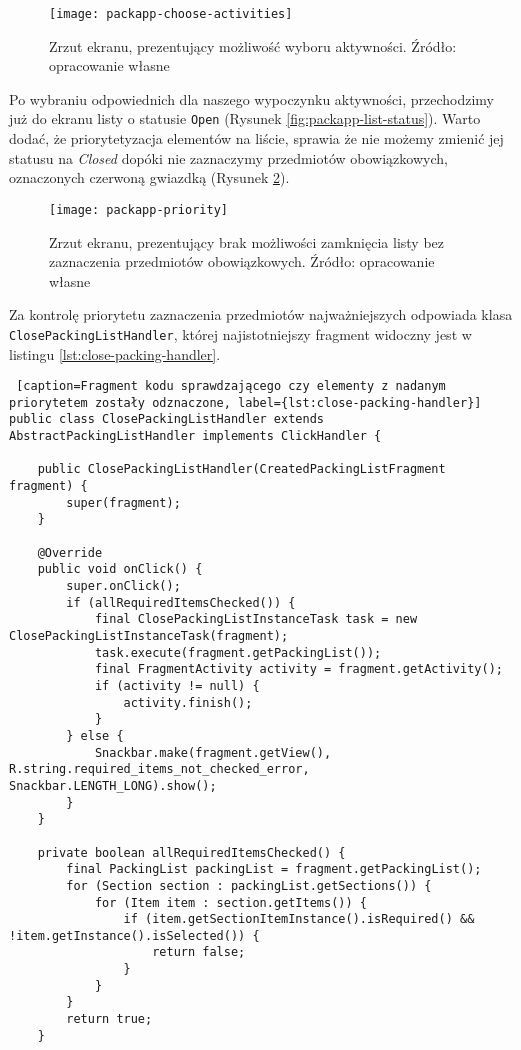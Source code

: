 \documentclass[a4paper,12pt]{article}
\begin{document}
\begin{figure}[H]
    \centering
    \texttt{[image: packapp-choose-activities]}
    \caption{Zrzut ekranu, prezentujący możliwość wyboru aktywności. Źródło: opracowanie własne}
    \label{fig:packapp-choose-activities}
\end{figure}

Po wybraniu odpowiednich dla naszego wypoczynku aktywności, przechodzimy już do ekranu listy o statusie \texttt{Open} (Rysunek \ref{fig:packapp-list-status}). Warto dodać, że priorytetyzacja elementów na liście, sprawia że nie możemy zmienić jej statusu na \textit{Closed} dopóki nie zaznaczymy przedmiotów obowiązkowych, oznaczonych czerwoną gwiazdką (Rysunek \ref{fig:packapp-priority}).

\begin{figure}[H]
    \centering
    \texttt{[image: packapp-priority]}
    \caption{Zrzut ekranu, prezentujący brak możliwości zamknięcia listy bez zaznaczenia przedmiotów obowiązkowych. Źródło: opracowanie własne}
    \label{fig:packapp-priority}
\end{figure}

Za kontrolę priorytetu zaznaczenia przedmiotów najważniejszych odpowiada klasa \texttt{ClosePackingListHandler}, której najistotniejszy fragment widoczny jest w listingu \ref{lst:close-packing-handler}.

\begin{lstlisting} [caption=Fragment kodu sprawdzającego czy elementy z nadanym priorytetem zostały odznaczone, label={lst:close-packing-handler}]
public class ClosePackingListHandler extends AbstractPackingListHandler implements ClickHandler {

    public ClosePackingListHandler(CreatedPackingListFragment fragment) {
        super(fragment);
    }

    @Override
    public void onClick() {
        super.onClick();
        if (allRequiredItemsChecked()) {
            final ClosePackingListInstanceTask task = new ClosePackingListInstanceTask(fragment);
            task.execute(fragment.getPackingList());
            final FragmentActivity activity = fragment.getActivity();
            if (activity != null) {
                activity.finish();
            }
        } else {
            Snackbar.make(fragment.getView(), R.string.required_items_not_checked_error, Snackbar.LENGTH_LONG).show();
        }
    }

    private boolean allRequiredItemsChecked() {
        final PackingList packingList = fragment.getPackingList();
        for (Section section : packingList.getSections()) {
            for (Item item : section.getItems()) {
                if (item.getSectionItemInstance().isRequired() && !item.getInstance().isSelected()) {
                    return false;
                }
            }
        }
        return true;
    }
\end{lstlisting}
\end{document}
